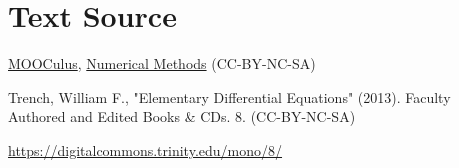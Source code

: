 \documentclass{ximera}
\begin{document}
 
 
 
 
 
\section*{Text Source}
\href{https://github.com/mooculus/calculus}{MOOCulus},
\href{https://github.com/mooculus/calculus/blob/a5d5bc54f341b1f3224dde40168188e81032ef65/differentialEquations/digInDifferentialEquations.tex#L1}{Numerical Methods} (CC-BY-NC-SA)
 
Trench, William F., "Elementary Differential Equations" (2013). Faculty Authored and Edited Books \& CDs. 8. (CC-BY-NC-SA)

\href{https://digitalcommons.trinity.edu/mono/8/}{https://digitalcommons.trinity.edu/mono/8/} 
 
\end{document}
